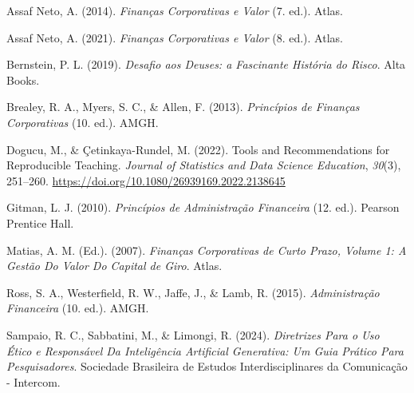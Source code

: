 \documentclass[
  a4paper,
]{book}
\newlength{\cslhangindent}
\newenvironment{CSLReferences}[2] %
 {\begin{list}{}{%
  \setlength{\itemindent}{0pt}
  \setlength{\leftmargin}{0pt}
  \setlength{\parsep}{0pt}
  \ifodd #1
   \setlength{\leftmargin}{\cslhangindent}
   \setlength{\itemindent}{-1\cslhangindent}
  \fi
  \setlength{\itemsep}{#2\baselineskip}}}
 {\end{list}}
\begin{document}

\label{refs}
\begin{CSLReferences}{1}{0}
Assaf Neto, A. (2014). \emph{Finan{ç}as Corporativas e Valor} (7. ed.).
Atlas.

Assaf Neto, A. (2021). \emph{Finan{ç}as Corporativas e Valor} (8. ed.).
Atlas.

Bernstein, P. L. (2019). \emph{{Desafio aos Deuses: a Fascinante
Hist{ó}ria do Risco}}. Alta Books.

Brealey, R. A., Myers, S. C., \& Allen, F. (2013). \emph{Princ{í}pios de
Finan{ç}as Corporativas} (10. ed.). AMGH.

Dogucu, M., \& Çetinkaya-Rundel, M. (2022). Tools and Recommendations
for Reproducible Teaching. \emph{Journal of Statistics and Data Science
Education}, \emph{30}(3), 251--260.
\url{https://doi.org/10.1080/26939169.2022.2138645}

Gitman, L. J. (2010). \emph{Princ{í}pios de Administra{ç}{ã}o
Financeira} (12. ed.). Pearson Prentice Hall.

Matias, A. M. (Ed.). (2007). \emph{Finan{ç}as Corporativas de Curto
Prazo, Volume 1: A Gest{ã}o Do Valor Do Capital de Giro}. Atlas.

Ross, S. A., Westerfield, R. W., Jaffe, J., \& Lamb, R. (2015).
\emph{Administra{ç}{ã}o Financeira} (10. ed.). AMGH.

Sampaio, R. C., Sabbatini, M., \& Limongi, R. (2024). \emph{Diretrizes
Para o Uso {É}tico e Respons{á}vel Da Intelig{ê}ncia Artificial
Generativa: Um Guia Pr{á}tico Para Pesquisadores}. Sociedade Brasileira
de Estudos Interdisciplinares da Comunica{ç}{ã}o - Intercom.

\end{CSLReferences}


\backmatter

\printindex

\end{document}
